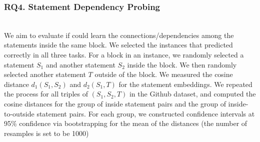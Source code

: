 \subsubsection{RQ4. Statement Dependency Probing}~\\
We aim to evaluate if {\tool} could learn the
connections/dependencies among the statements
inside the same  block. We selected the
instances that {\tool} predicted correctly in all three tasks. For
a  block in an instance, we randomly selected a
statement $S_1$ and another statement $S_2$ inside the block. We then
randomly selected another statement $T$ outside of the block. We
measured the cosine distance $d_1(S_1,S_2)$ and $d_2(S_1,T)$ for the
statement embeddings. We repeated the process for all triples of
$(S_1,S_2,T)$ in the Github dataset, and computed the cosine distances
for the group of inside statement pairs and the group of
inside-to-outside statement pairs. For each group, we constructed
confidence intervals at 95\% confidence via bootstrapping for the mean
of the distances (the number of resamples is set to be 1000)




 
